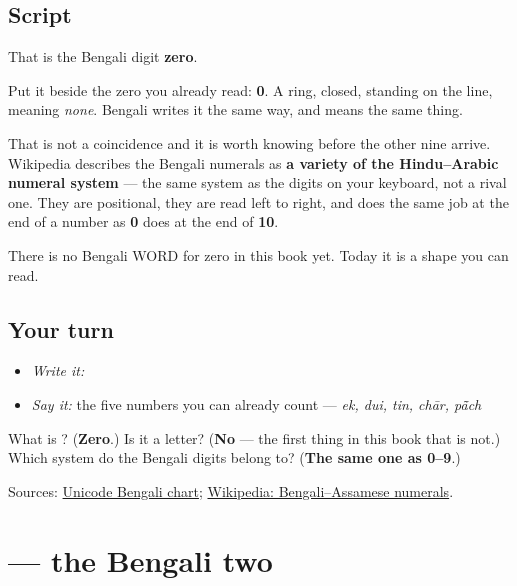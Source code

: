 \subsection*{Script}
\begin{quote}
\end{quote}

That is the Bengali digit \textbf{zero}.

Put it beside the zero you already read: \textbf{0}. A ring, closed, standing on the line, meaning \emph{none}. Bengali writes it the same way, and means the same thing.

That is not a coincidence and it is worth knowing before the other nine arrive. Wikipedia describes the Bengali numerals as \textbf{a variety of the Hindu–Arabic numeral system} — the same system as the digits on your keyboard, not a rival one. They are positional, they are read left to right, and \textbf{} does the same job at the end of a number as \textbf{0} does at the end of \textbf{10}.

There is no Bengali WORD for zero in this book yet. Today it is a shape you can read.

\subsection*{Your turn}
\begin{itemize}
\raggedright
  \item \emph{Write it:} 
  \item \emph{Say it:} the five numbers you can already count — \emph{ek, dui, tin, chār, pā̃ch}
\end{itemize}

\begin{tcolorbox}[breakable,colback=teal!4,colframe=teal!35!black,title={Before you move on}]
What is \textbf{}? (\textbf{Zero}.) Is it a letter? (\textbf{No} — the first thing in this book that is not.) Which system do the Bengali digits belong to? (\textbf{The same one as 0–9}.)

Sources: \href{https://www.unicode.org/charts/PDF/U0980.pdf}{Unicode Bengali chart}; \href{https://en.wikipedia.org/wiki/Bengali\%E2\%80\%93Assamese\_numerals}{Wikipedia: Bengali–Assamese numerals}.
\end{tcolorbox}
\section[\texorpdfstring{\bn{২} (digit two)}{২ (digit two)}]{ — the Bengali two}


